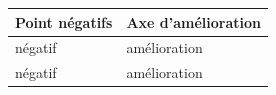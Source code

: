 \documentclass[a4paper]{article}
\begin{document}
    \begin{table}[H]
    \centering
    \begin{tabularx}{\textwidth}{|X|X|}
    \hline
    \textbf{Point négatifs} & \textbf{Axe d'amélioration} \\ \hline
    négatif & amélioration \\ \hline
    négatif & amélioration \\ \hline
    \end{tabularx}
    \end{table}
\end{document}
